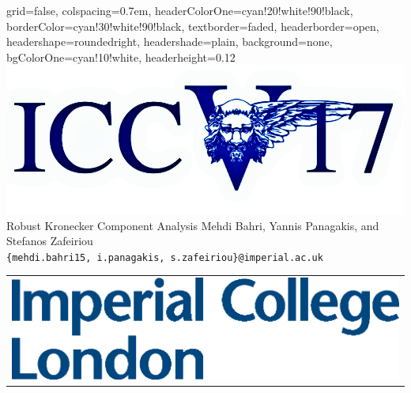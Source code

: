 \documentclass[landscape,a1paper,fontscale=0.42]{baposter}
\begin{document}
\vspace*{-1mm}
\begin{poster}{
 grid=false,
 colspacing=0.7em,
 headerColorOne=cyan!20!white!90!black,
 borderColor=cyan!30!white!90!black,
 textborder=faded,
 headerborder=open,
 headershape=roundedright,
 headershade=plain,
 background=none,
 bgColorOne=cyan!10!white,
 headerheight=0.12\textheight}
 {
      \includegraphics[width=0.205\linewidth]{iccv}
 }
 {\sc\Huge Robust Kronecker Component Analysis}
 {Mehdi Bahri, Yannis Panagakis, and Stefanos Zafeiriou\\[1em]
 {\texttt{\{mehdi.bahri15, i.panagakis, s.zafeiriou\}@imperial.ac.uk}}}
 {
  \begin{tabular}{r}
    \includegraphics[width=0.22\textheight]{logo}
  \end{tabular}
 }



\end{poster}
\end{document}
